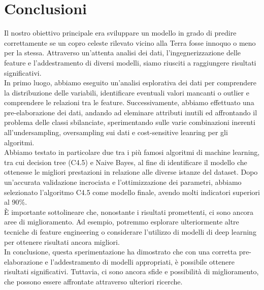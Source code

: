 \documentclass[italian,12pt,a4paper]{article}
\begin{document}
	\section{Conclusioni}
	Il nostro obiettivo principale era sviluppare un modello in grado di predire correttamente se un copro celeste rilevato vicino alla Terra fosse innoquo o meno per la stessa. Attraverso un'attenta analisi dei dati, l'ingegnerizzazione delle feature e l'addestramento di diversi modelli, siamo riusciti a raggiungere risultati significativi. \\
	\linebreak
	In primo luogo, abbiamo eseguito un'analisi esplorativa dei dati per comprendere la distribuzione delle variabili, identificare eventuali valori mancanti o outlier e comprendere le relazioni tra le feature. Successivamente, abbiamo effettuato una pre-elaborazione dei dati, andando ad eleminare attributi inutili ed affrontando il problema delle classi sbilanciate, sperimentando sulle varie combinazioni inerenti all'undersampling, oversampling sui dati e cost-sensitive leanring per gli algoritmi.\\
	\linebreak
	Abbiamo testato in particolare due tra i più famosi algoritmi di machine learning, tra cui decision tree (C4.5) e Naive Bayes, al fine di identificare il modello che ottenesse le migliori prestazioni in relazione alle diverse istanze del dataset. Dopo un'accurata validazione incrociata e l'ottimizzazione dei parametri, abbiamo selezionato l'algoritmo C4.5 come modello finale, avendo molti indicatori superiori al 90\%.\\
	\linebreak
	È importante sottolineare che, nonostante i risultati promettenti, ci sono ancora aree di miglioramento. Ad esempio, potremmo esplorare ulteriormente altre tecniche di feature engineering o considerare l'utilizzo di modelli di deep learning per ottenere risultati ancora migliori. \\
	\linebreak
	In conclusione, questa sperimentazione ha dimostrato che con una corretta pre-elaborazione e l'addestramento di modelli appropriati, è possibile ottenere risultati significativi. Tuttavia, ci sono ancora sfide e possibilità di miglioramento, che possono essere affrontate attraverso ulteriori ricerche.
	
\end{document}
